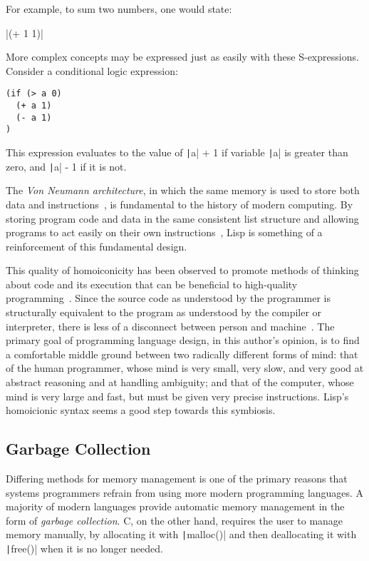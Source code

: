 \documentclass[11pt,a4paper]{article}
\theoremstyle{break}
\begin{document}
For example, to sum two numbers, one would state:
\FloatBarrier
\begin{listing*}[h!]
    \centering
    |(+ 1 1)|
\end{listing*}
\FloatBarrier
More complex concepts may be expressed just as easily with these S-expressions. Consider a conditional logic expression:
\FloatBarrier
\begin{listing*}[h!]
    \centering
\begin{verbatim}
(if (> a 0)
  (+ a 1)
  (- a 1)
)
\end{verbatim}
\end{listing*}
\FloatBarrier
This expression evaluates to the value of \texttt|a| + 1 if variable \texttt|a| is greater than zero, and \texttt|a| - 1 if it is not.

The \textit{Von Neumann architecture}, in which the same memory is used to store both data and instructions~\cite{von1993first}, is fundamental to the history of modern computing. By storing program code and data in the same consistent list structure and allowing programs to act easily on their own instructions~\cite{Smith:1984:RSL:800017.800513}, Lisp is something of a reinforcement of this fundamental design.

This quality of homoiconicity has been observed to promote methods of thinking about code and its execution that can be beneficial to high-quality programming~\cite{sicp,raymond2003become}. Since the source code as understood by the programmer is structurally equivalent to the program as understood by the compiler or interpreter, there is less of a disconnect between person and machine~\cite{sicp}. The primary goal of programming language design, in this author's opinion, is to find a comfortable middle ground between two radically different forms of mind: that of the human programmer, whose mind is very small, very slow, and very good at abstract reasoning and at handling ambiguity; and that of the computer, whose mind is very large and fast, but must be given very precise instructions. Lisp's homoicionic syntax seems a good step towards this symbiosis.

\subsection{Garbage Collection}\label{subsec:gc}

Differing methods for memory management is one of the primary reasons that systems programmers refrain from using more modern programming languages. A majority of modern languages provide automatic memory management in the form of \textit{garbage collection}. C, on the other hand, requires the user to manage memory manually, by allocating it with \texttt|malloc()| and then deallocating it with \texttt|free()| when it is no longer needed.
\end{document}
